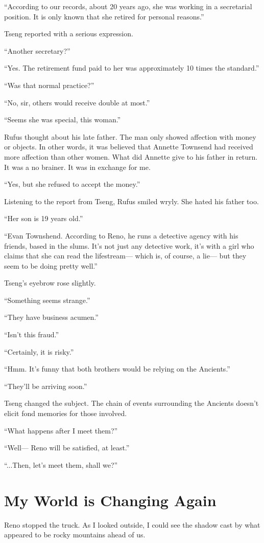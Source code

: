 \documentclass[oneside]{book}
\begin{document}
“According to our records, about 20 years ago, she was working in a secretarial position. It is only known that she retired for personal reasons.”

Tseng reported with a serious expression.

“Another secretary?”

“Yes. The retirement fund paid to her was approximately 10 times the standard.”

“Was that normal practice?”

“No, sir, others would receive double at most.”

“Seems she was special, this woman.”

Rufus thought about his late father. The man only showed affection with money or objects. In other words, it was believed that Annette Townsend had received more affection than other women. What did Annette give to his father in return. It was a no brainer. It was in exchange for me.

“Yes, but she refused to accept the money.”

Listening to the report from Tseng, Rufus smiled wryly. She hated his father too.

“Her son is 19 years old.”

“Evan Townshend. According to Reno, he runs a detective agency with his friends, based in the slums. It’s not just any detective work, it’s with a girl who claims that she can read the lifestream— which is, of course, a lie— but they seem to be doing pretty well.”

Tseng’s eyebrow rose slightly.

“Something seems strange.”

“They have business acumen.”

“Isn’t this fraud.”

“Certainly, it is risky.”

“Hmm. It’s funny that both brothers would be relying on the Ancients.”

“They’ll be arriving soon.”

Tseng changed the subject. The chain of events surrounding the Ancients doesn’t elicit fond memories for those involved.

“What happens after I meet them?”

“Well— Reno will be satisfied, at least.”

“...Then, let’s meet them, shall we?”

\chapter{My World is Changing Again}
Reno stopped the truck. As I looked outside, I could see the shadow cast by what appeared to be rocky mountains ahead of us.
\end{document}
